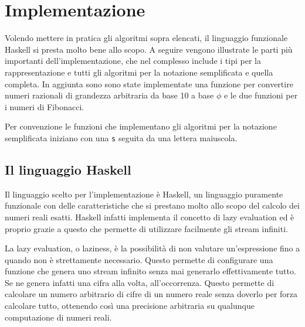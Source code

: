 \documentclass[Lau]{sapthesis}
\newcommand{\code}[1]{\colorbox{light-gray}{\texttt{#1}}}
\begin{document}
\chapter{Implementazione}
Volendo mettere in pratica gli algoritmi sopra elencati, il linguaggio funzionale Haskell si presta molto bene allo scopo. A seguire vengono illustrate le parti più importanti dell'implementazione, che nel complesso include i tipi per la rappresentazione e tutti gli algoritmi per la notazione semplificata e quella completa. In aggiunta sono sono state implementate una funzione per convertire numeri razionali di grandezza arbitraria da base 10 a base $\phi$ e le due funzioni per i numeri di Fibonacci.

Per convenzione le funzioni che implementano gli algoritmi per la notazione semplificata iniziano con una \code{s} seguita da una lettera maiuscola.


\section{Il linguaggio Haskell}
Il linguaggio scelto per l'implementazione è Haskell, un linguaggio puramente funzionale con delle caratteristiche che si prestano molto allo scopo del calcolo dei numeri reali esatti. Haskell infatti implementa il concetto di lazy evaluation ed è proprio grazie a questo che permette di utilizzare facilmente gli stream infiniti.

La lazy evaluation, o laziness, è la possibilità di non valutare un'espressione fino a quando non è strettamente necessario. Questo permette di configurare una funzione che genera uno stream infinito senza mai generarlo effettivamente tutto. Se ne genera infatti una cifra alla volta, all'occorrenza. Questo permette di calcolare un numero arbitrario di cifre di un numero reale senza doverlo per forza calcolare tutto, ottenendo così una precisione arbitraria su qualunque computazione di numeri reali.
\end{document}
